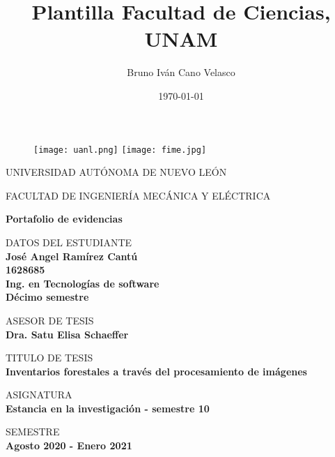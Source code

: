 \documentclass{article}
\title{Plantilla Facultad de Ciencias, UNAM}
\author{Bruno Iván Cano Velasco}
\date{\today}
\begin{document}
\thispagestyle{empty}
	
	\begin{figure}[ht]
			\texttt{[image: uanl.png]}
			\label{EscudoUNAM}
	   \endminipage
			\texttt{[image: fime.jpg]}
			\label{EscudoFC}
		\endminipage
	\end{figure}
	
	\begin{center}
	\LARGE
	UNIVERSIDAD AUTÓNOMA DE NUEVO LEÓN
	
	\vspace{0.2cm}
	\LARGE
	FACULTAD DE INGENIERÍA MECÁNICA Y ELÉCTRICA
	
	\vspace{0.5cm}	
	\Large
	\textbf{Portafolio de evidencias}

	\vspace{1cm}
	\normalsize	
	DATOS DEL ESTUDIANTE \\
	\vspace{.3cm}
	\large
	\textbf{José Angel Ramírez Cantú \\ 1628685 \\ Ing. en Tecnologías de software\\ Décimo semestre}
	
	\vspace{1.3cm}
	\normalsize	
	ASESOR DE TESIS \\
	\vspace{.3cm}
	\large
	\textbf{Dra. Satu Elisa Schaeffer}
	
	\vspace{1.3cm}
	\normalsize	
	TITULO DE TESIS \\
	\vspace{.3cm}
	\large
	\textbf{Inventarios forestales a través del procesamiento de imágenes}
	
	\vspace{1.3cm}
	\normalsize	
	ASIGNATURA \\
	\vspace{.3cm}
	\large
	\textbf{Estancia en la investigación - semestre 10}
	
	\vspace{1.3cm}
	\normalsize	
	SEMESTRE \\
	\vspace{.3cm}
	\large
	\textbf{Agosto 2020 - Enero 2021}

	\end{center}
	
	\newpage
	
\end{document}
